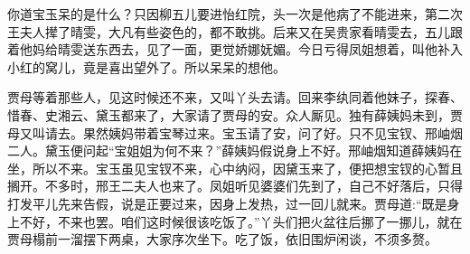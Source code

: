 \begin{parag}
    你道宝玉呆的是什么？只因柳五儿要进怡红院，头一次是他病了不能进来，第二次王夫人撵了晴雯，大凡有些姿色的，都不敢挑。后来又在吴贵家看晴雯去，五儿跟着他妈给晴雯送东西去，见了一面，更觉娇娜妩媚。今日亏得凤姐想着，叫他补入小红的窝儿，竟是喜出望外了。所以呆呆的想他。
\end{parag}


\begin{parag}
    贾母等着那些人，见这时候还不来，又叫丫头去请。回来李纨同着他妹子，探春、惜春、史湘云、黛玉都来了，大家请了贾母的安。众人厮见。独有薛姨妈未到，贾母又叫请去。果然姨妈带着宝琴过来。宝玉请了安，问了好。只不见宝钗、邢岫烟二人。黛玉便问起“宝姐姐为何不来？”薛姨妈假说身上不好。邢岫烟知道薛姨妈在坐，所以不来。宝玉虽见宝钗不来，心中纳闷，因黛玉来了，便把想宝钗的心暂且搁开。不多时，邢王二夫人也来了。凤姐听见婆婆们先到了，自己不好落后，只得打发平儿先来告假，说是正要过来，因身上发热，过一回儿就来。贾母道:“既是身上不好，不来也罢。咱们这时候很该吃饭了。”丫头们把火盆往后挪了一挪儿，就在贾母榻前一溜摆下两桌，大家序次坐下。吃了饭，依旧围炉闲谈，不须多赘。
\end{parag}


